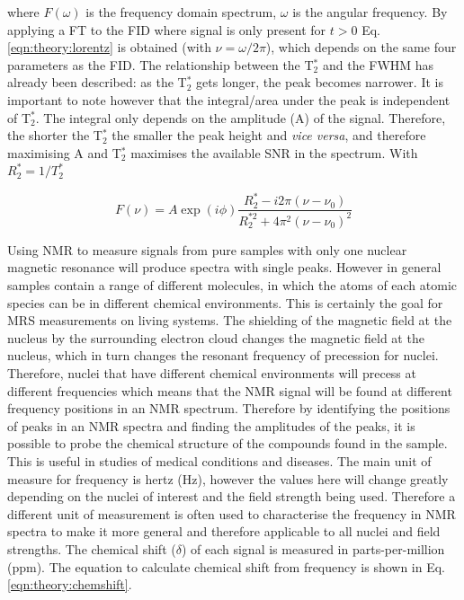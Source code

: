 \noindent where $F(\omega)$ is the frequency domain spectrum, $\omega$ is the angular frequency. By applying a \ac{FT} to the \ac{FID} where signal is only present  for $t > 0$ Eq. \ref{eqn:theory:lorentz} is obtained (with $\nu = \omega/2\pi$), which depends on the same four parameters as the \ac{FID}. The relationship between the T$_2^*$ and the FWHM has already been described: as the T$_2^*$ gets longer, the peak becomes narrower. It is important to note however that the integral/area under the peak is independent of T$_2^*$. The integral only depends on the amplitude (A) of the signal. Therefore, the shorter the T$_2^*$ the smaller the peak height and \textit{vice versa}, and therefore maximising A and T$_2^*$ maximises the available \ac{SNR} in the spectrum. With $R_2^* = 1/T_2^*$

\begin{equation}
    F(\nu) = A\exp(i\phi)\frac{R_2^*-i2\pi(\nu-\nu_0)}{R_2^{*2}+4\pi^2(\nu-\nu_0)^2}
    \label{eqn:theory:lorentz}
\end{equation}

Using \ac{NMR} to measure signals from pure samples with only one nuclear magnetic resonance will produce spectra with single peaks. However in general samples contain a range of different molecules, in which the atoms of each atomic species can be in different chemical environments. This is certainly the goal for \ac{MRS} measurements on living systems. The shielding of the magnetic field at the nucleus by the surrounding electron cloud changes the magnetic field at the nucleus, which in turn changes the resonant frequency of precession for nuclei. Therefore, nuclei that have different chemical environments will precess at different frequencies which means that the \ac{NMR} signal will be found at different frequency positions in an \ac{NMR} spectrum. Therefore by identifying the positions of peaks in an \ac{NMR} spectra and finding the amplitudes of the peaks, it is possible to probe the chemical structure of the compounds found in the sample. This is useful in studies of medical conditions and diseases. The main unit of measure for frequency is hertz (Hz), however the values here will change greatly depending on the nuclei of interest and the field strength being used. Therefore a different unit of measurement is often used to characterise the frequency in \ac{NMR} spectra to make it more general and therefore applicable to all nuclei and field strengths. The chemical shift ($\delta$) of each signal is measured in parts-per-million (ppm). The equation to calculate chemical shift from frequency is shown in Eq. \ref{eqn:theory:chemshift}.

